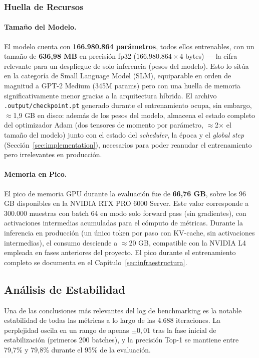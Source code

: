 \subsubsection{Huella de Recursos}

\paragraph{Tamaño del Modelo.}
El modelo cuenta con \textbf{166.980.864 parámetros}, todos ellos entrenables, con un tamaño de \textbf{636,98 MB} en precisión fp32 ($166.980.864 \times 4$ bytes) --- la cifra relevante para un despliegue de solo inferencia (pesos del modelo). Esto lo sitúa en la categoría de Small Language Model (SLM), equiparable en orden de magnitud a GPT-2 Medium (345M params) pero con una huella de memoria significativamente menor gracias a la arquitectura híbrida. El archivo \texttt{.output/checkpoint.pt} generado durante el entrenamiento ocupa, sin embargo, $\approx$1,9 GB en disco: además de los pesos del modelo, almacena el estado completo del optimizador Adam (dos tensores de momento por parámetro, $\approx$2$\times$ el tamaño del modelo) junto con el estado del \textit{scheduler}, la época y el \textit{global step} (Sección~\ref{sec:implementation}), necesarios para poder reanudar el entrenamiento pero irrelevantes en producción.

\paragraph{Memoria en Pico.}
El pico de memoria GPU durante la evaluación fue de \textbf{66,76 GB}, sobre los 96 GB disponibles en la NVIDIA RTX PRO 6000 Server. Este valor corresponde a 300.000 muestras con batch 64 en modo solo forward pass (sin gradientes), con activaciones intermedias acumuladas para el cómputo de métricas. Durante la inferencia en producción (un único token por paso con KV-cache, sin activaciones intermedias), el consumo desciende a $\approx$20 GB, compatible con la NVIDIA L4 empleada en fases anteriores del proyecto. El pico durante el entrenamiento completo se documenta en el Capítulo~\ref{sec:infraestructura}.

\subsection{Análisis de Estabilidad}

Una de las conclusiones más relevantes del log de benchmarking es la notable estabilidad de todas las métricas a lo largo de las 4.688 iteraciones. La perplejidad oscila en un rango de apenas $\pm 0{,}01$ tras la fase inicial de estabilización (primeros 200 batches), y la precisión Top-1 se mantiene entre 79,7\% y 79,8\% durante el 95\% de la evaluación.

